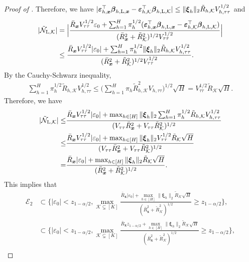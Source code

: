 \documentclass[12pt]{article}
\newcommand{\Lin}{\textnormal{L}}
\newcommand{\mk}{\mathcal{K}}
\newcommand{\bs}{\boldsymbol}
\begin{document}
\begin{proof}[Proof of ]
Therefore, we have $|\bs{\varepsilon}_{ h, \bs{x}}^\top \bs{\beta}_{h, \Lin , \bs{x}}-\bs{\varepsilon}_{ h, \mk}^\top\bs{\beta}_{ h, \Lin, \mk}| \leq \|\bs{\xi}_{ h }\|_2\tilde{R}_{ h, \mk}V_{ h,\tau\tau}^{1/2}$ and
\begin{align*}
    |\tilde{\mathcal{N}}_{\Lin,\mk}| &= \Big| \frac{\bar{R}_{\bs{x}} V_{\tau\tau}^{1/2}\varepsilon_0+\sum_{h=1}^H \pi_{ h }^{1/2}(\bs{\varepsilon}_{ h, \bs{x}}^\top \bs{\beta}_{h, \Lin , \bs{x}}-\bs{\varepsilon}_{ h, \mk}^\top\bs{\beta}_{ h, \Lin, \mk})}{(\bar{R}_{\bs{x}}^2 +\tilde{R}^2_{\mk})^{1/2}V_{\tau\tau}^{1/2}} \Big|\\
    &\leq \frac{\bar{R}_{\bs{x}} V_{\tau\tau}^{1/2}|\varepsilon_0|+\sum_{h=1}^H \pi_{ h }^{1/2}\|\bs{\xi}_{ h }\|_2\tilde{R}_{ h, \mk}V_{ h,\tau\tau}^{1/2}}{(\bar{R}_{\bs{x}}^2 +\tilde{R}^2_{\mk})^{1/2}V_{\tau\tau}^{1/2}}.
\end{align*}
By the Cauchy-Schwarz inequality,
\begin{align*}
    \sum_{h=1}^H \pi_{ h }^{1/2} \tilde{R}_{ h, \mk}V_{ h,\tau\tau}^{1/2} \leq \Big(\sum_{h=1}^H \pi_{ h } \tilde{R}^2_{h,\mk} V_{ h,\tau\tau}\Big)^{1/2} \sqrt{H} = V_{\tau\tau}^{1/2}\tilde{R}_{\mk}\sqrt{H}.
\end{align*}
Therefore, we have
\begin{align*}
    |\tilde{\mathcal{N}}_{\Lin,\mk}|\leq & \frac{\bar{R}_{\bs{x}} V_{\tau\tau}^{1/2}|\varepsilon_0|+\max_{h\in [H]}\|\bs{\xi}_{ h }\|_2 \sum_{h=1}^H \pi_{ h }^{1/2}\tilde{R}_{ h, \mk}V_{ h,\tau\tau}^{1/2}}{(V_{\tau\tau}\bar{R}_{\bs{x}}^2 +V_{\tau\tau}\tilde{R}^2_{\mk})^{1/2}}\\
    \leq & \frac{\bar{R}_{\bs{x}} V_{\tau\tau}^{1/2}|\varepsilon_0|+\max_{h\in [H]}\|\bs{\xi}_{ h }\|_2 V_{\tau\tau}^{1/2}\tilde{R}_{\mk}\sqrt{H}}{(V_{\tau\tau}\bar{R}_{\bs{x}}^2 +V_{\tau\tau}\tilde{R}^2_{\mk})^{1/2}}\\
    =&  \frac{\bar{R}_{\bs{x}} |\varepsilon_0|+\max_{h\in [H]}\|\bs{\xi}_{ h }\|_2 \tilde{R}_{\mk}\sqrt{H}}{(\bar{R}_{\bs{x}}^2 +\tilde{R}^2_{\mk})^{1/2}}.
\end{align*}
This implies that
\begin{align*}
\mathcal{E}_2 & \subset \Big\{|\varepsilon_0| < z_{1-\alpha/2},\max_{\mk \subsetneq [K]}\frac{\bar{R}_{\bs{x}} |\varepsilon_0|+\max_{h\in [H]} \|\bs{\xi}_{ h }\|_2\tilde{R}_{\mk}\sqrt{H}}{(\bar{R}_{\bs{x}}^2 +\tilde{R}^2_{\mk})^{1/2}} \geq z_{1-\alpha/2}\Big\},\\
   & \subset \Big\{|\varepsilon_0| < z_{1-\alpha/2},\max_{\mk \subsetneq [K]}\frac{\bar{R}_{\bs{x}} z_{1-\alpha/2}+\max_{h\in [H]} \|\bs{\xi}_{ h }\|_2\tilde{R}_{\mk}\sqrt{H}}{(\bar{R}_{\bs{x}}^2 +\tilde{R}^2_{\mk})^{1/2}} \geq z_{1-\alpha/2}\Big\},\\

\end{align*}
\end{proof}
\end{document}
